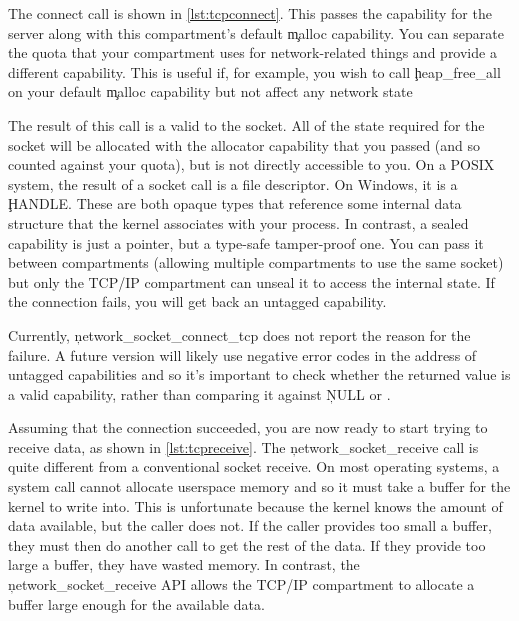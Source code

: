\codelisting[filename=examples/tcp/tcp.cc,marker=server_capability,label=lst:tcpconnectcap,caption="A static capability that authorises connecting to a remote server."]{}

The connect call is shown in \ref{lst:tcpconnect}.
This passes the capability for the server along with this compartment's default \c{malloc} capability.
You can separate the quota that your compartment uses for network-related things and provide a different capability.
This is useful if, for example, you wish to call \c{heap_free_all} on your default \c{malloc} capability but not affect any network state

\codelisting[filename=examples/tcp/tcp.cc,marker=connect,label=lst:tcpconnect,caption="Connecting to a remote server."]{}

The result of this call is a valid  to the socket.
All of the state required for the socket will be allocated with the allocator capability that you passed (and so counted against your quota), but is not directly accessible to you.
On a POSIX system, the result of a socket call is a file descriptor.
On Windows, it is a \c{HANDLE}.
These are both opaque types that reference some internal data structure that the kernel associates with your process.
In contrast, a sealed capability is just a pointer, but a type-safe tamper-proof one.
You can pass it between compartments (allowing multiple compartments to use the same socket) but only the TCP/IP compartment can unseal it to access the internal state.
If the connection fails, you will get back an untagged capability.

\begin{note}
Currently, \c{network_socket_connect_tcp} does not report the reason for the failure.
A future version will likely use negative error codes in the address of untagged capabilities and so it's important to check whether the returned value is a valid capability, rather than comparing it against \c{NULL} or .
\end{note}

Assuming that the connection succeeded, you are now ready to start trying to receive data, as shown in \ref{lst:tcpreceive}.
The \c{network_socket_receive} call is quite different from a conventional socket receive.
On most operating systems, a system call cannot allocate userspace memory and so it must take a buffer for the kernel to write into.
This is unfortunate because the kernel knows the amount of data available, but the caller does not.
If the caller provides too small a buffer, they must then do another call to get the rest of the data.
If they provide too large a buffer, they have wasted memory.
In contrast, the \c{network_socket_receive} API allows the TCP/IP compartment to allocate a buffer large enough for the available data.

